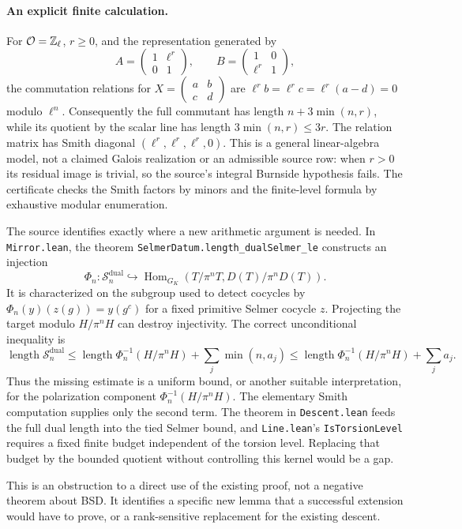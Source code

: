 \paragraph{An explicit finite calculation.}
For $\mathcal O=\mathbb Z_\ell$, $r\ge0$, and the representation generated by
\[
 A=\begin{pmatrix}1&\ell^r\\0&1\end{pmatrix},\qquad
 B=\begin{pmatrix}1&0\\\ell^r&1\end{pmatrix},
\]
the commutation relations for
$X=\left(\begin{smallmatrix}a&b\\c&d\end{smallmatrix}\right)$ are
$\ell^r b=\ell^r c=\ell^r(a-d)=0$ modulo $\ell^n$.
Consequently the full commutant has length $n+3\min(n,r)$, while its
quotient by the scalar line has length $3\min(n,r)\le3r$.
The relation matrix has Smith diagonal
$(\ell^r,\ell^r,\ell^r,0)$.
This is a general linear-algebra model, not a claimed Galois realization
or an admissible source row: when $r>0$ its residual image is trivial,
so the source's integral Burnside hypothesis fails. The certificate
checks the Smith factors by minors and the finite-level formula by
exhaustive modular enumeration.

The source identifies exactly where a new arithmetic argument is needed.
In \texttt{Mirror.lean}, the theorem
\texttt{SelmerDatum.length\_dualSelmer\_le} constructs an injection
\[
 \Phi_n:\mathcal S_n^{\mathrm{dual}}\hookrightarrow
 \operatorname{Hom}_{G_K}(T/\pi^nT,D(T)/\pi^nD(T)).
\]
It is characterized on the subgroup used to detect cocycles by
$\Phi_n(y)(z(g))=y(g^c)$ for a fixed primitive Selmer cocycle $z$.
Projecting the target modulo $H/\pi^nH$ can destroy injectivity.  The
correct unconditional inequality is
\[
 \operatorname{length}\mathcal S_n^{\mathrm{dual}}
 \le
 \operatorname{length}\Phi_n^{-1}(H/\pi^nH)
 +\sum_j\min(n,a_j)
 \le\operatorname{length}\Phi_n^{-1}(H/\pi^nH)+\sum_j a_j.
\]
Thus the missing estimate is a uniform bound, or another suitable
interpretation, for the polarization component
$\Phi_n^{-1}(H/\pi^nH)$.  The elementary Smith computation supplies only
the second term.  The theorem in \texttt{Descent.lean} feeds the full
dual length into the tied Selmer bound, and
\texttt{Line.lean}'s \texttt{IsTorsionLevel} requires a fixed finite
budget independent of the torsion level.  Replacing that budget by the
bounded quotient without controlling this kernel would be a gap.

This is an obstruction to a direct use of the existing proof, not a
negative theorem about BSD.  It identifies a specific new lemma that a
successful extension would have to prove, or a rank-sensitive replacement
for the existing descent.

